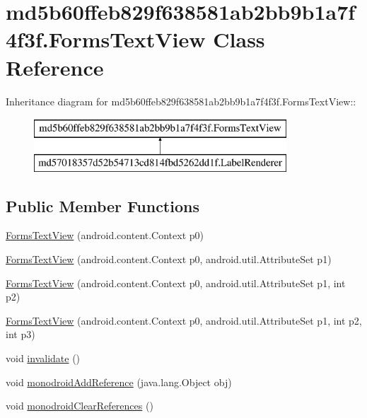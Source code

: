 \hypertarget{classmd5b60ffeb829f638581ab2bb9b1a7f4f3f_1_1_forms_text_view}{
\section{md5b60ffeb829f638581ab2bb9b1a7f4f3f.FormsTextView Class Reference}
\label{classmd5b60ffeb829f638581ab2bb9b1a7f4f3f_1_1_forms_text_view}
}
Inheritance diagram for md5b60ffeb829f638581ab2bb9b1a7f4f3f.FormsTextView::\begin{figure}[H]
\begin{center}
\leavevmode
\includegraphics[height=2cm]{classmd5b60ffeb829f638581ab2bb9b1a7f4f3f_1_1_forms_text_view}
\end{center}
\end{figure}
\subsection*{Public Member Functions}
\begin{CompactItemize}
\item 
\hyperlink{classmd5b60ffeb829f638581ab2bb9b1a7f4f3f_1_1_forms_text_view_afad6c761c1d359ba5d9ba2e7d58f6a6}{FormsTextView} (android.content.Context p0)
\item 
\hyperlink{classmd5b60ffeb829f638581ab2bb9b1a7f4f3f_1_1_forms_text_view_7d3c80cbb7333b06cbafacf194ac26ec}{FormsTextView} (android.content.Context p0, android.util.AttributeSet p1)
\item 
\hyperlink{classmd5b60ffeb829f638581ab2bb9b1a7f4f3f_1_1_forms_text_view_9cd58a7bb5d5ce0c7076ae35404b2138}{FormsTextView} (android.content.Context p0, android.util.AttributeSet p1, int p2)
\item 
\hyperlink{classmd5b60ffeb829f638581ab2bb9b1a7f4f3f_1_1_forms_text_view_2900a37d92cd0ef85a4290ae3b6bf3d9}{FormsTextView} (android.content.Context p0, android.util.AttributeSet p1, int p2, int p3)
\item 
void \hyperlink{classmd5b60ffeb829f638581ab2bb9b1a7f4f3f_1_1_forms_text_view_93c3c0adf589f26fea5031e1e9b484c3}{invalidate} ()
\item 
void \hyperlink{classmd5b60ffeb829f638581ab2bb9b1a7f4f3f_1_1_forms_text_view_20925dbf92ee998bfae5cc3aca483f3a}{monodroidAddReference} (java.lang.Object obj)
\item 
void \hyperlink{classmd5b60ffeb829f638581ab2bb9b1a7f4f3f_1_1_forms_text_view_ae0338a9a14411e891317f37a37f4f58}{monodroidClearReferences} ()
\end{CompactItemize}
